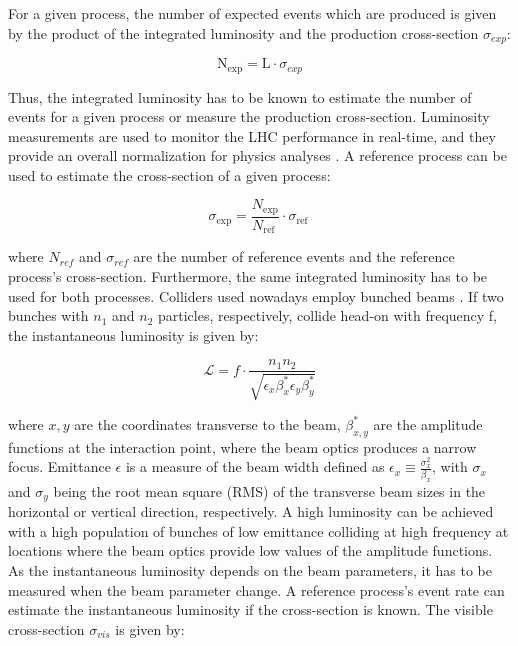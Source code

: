 For a given process, the number of expected events which are produced is given by the product of the integrated luminosity and the production cross-section $\sigma_{exp}$:

\begin{equation}
  \mathrm{N_{exp}}=\mathrm{L} \cdot \sigma_{exp}
\end{equation}

Thus, the integrated luminosity has to be known to estimate the number of events for a given process or measure the production cross-section. Luminosity measurements are used to monitor the LHC performance in real-time, and they provide an overall normalization for physics analyses \cite{Bayatian:2006nff}. A reference process can be used to estimate the cross-section of a given process:

\begin{equation}
  \sigma_{\exp }=\frac{N_{\exp }}{N_{\text {ref }}} \cdot \sigma_{\text {ref }}
\end{equation}

where $N_{ref}$ and $\sigma_{ref}$ are the number of reference events and the reference process's cross-section. Furthermore, the same integrated luminosity has to be used for both processes. Colliders used nowadays employ bunched beams \cite{Tanabashi:2018oca}. If two bunches with $n_1$ and $n_2$ particles, respectively, collide head-on with frequency f, the instantaneous luminosity is given by:

\begin{equation}
\mathcal{L}=f \cdot \frac{n_{1} n_{2}}{\sqrt{\epsilon_{x} \beta_{x}^{*} \epsilon_{y} \beta_{y}^{*}}}
\end{equation}

where ${x,y}$ are the coordinates transverse to the beam, $\beta^*_{x,y}$ are the amplitude functions at the interaction point, where the beam optics produces a narrow focus. Emittance $\epsilon$ is a measure of the beam width defined as $\epsilon_{x} \equiv \frac{\sigma_{x}^{2}}{\beta_{x}}$, with $\sigma_{x}$ and $\sigma_{y}$ being the root mean square (RMS) of the transverse beam sizes in the horizontal or vertical direction, respectively. A high luminosity can be achieved with a high population of bunches of low emittance colliding at high frequency at locations where the beam optics provide low values of the amplitude functions. As the instantaneous luminosity depends on the beam parameters, it has to be measured when the beam parameter change. A reference process's event rate can estimate the instantaneous luminosity if the cross-section is known. The visible cross-section $\sigma_{vis}$ is given by:

